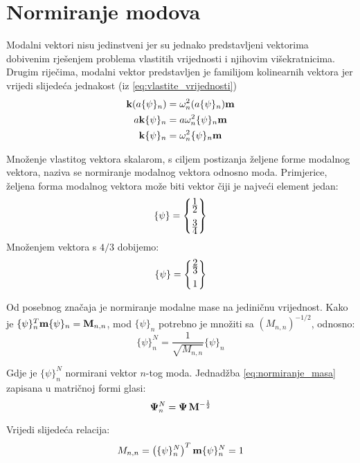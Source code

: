 \section{Normiranje modova}
Modalni vektori nisu jedinstveni jer su jednako predstavljeni vektorima dobivenim
rješenjem problema vlastitih vrijednosti i njihovim višekratnicima. Drugim riječima,
modalni vektor predstavljen je familijom kolinearnih vektora jer vrijedi slijedeća
jednakost (iz \eqref{eq:vlastite_vrijednosti})
\[
    \begin{aligned}
        \mathbf{k}(a\{\psi\}_n)&=\omega_n^2(a\{\psi\}_n)\mathbf{m}\\
        a\mathbf{k}\{\psi\}_n&=a\omega_n^2\{\psi\}{}_n\mathbf{m}\\
        \mathbf{k}\{\psi\}_n&=\omega_n^2\{\psi\}_n\mathbf{m}
    \end{aligned}
\]

Množenje vlastitog vektora skalarom, s ciljem postizanja željene forme modalnog
vektora, naziva se normiranje modalnog vektora odnosno moda. Primjerice, željena forma 
modalnog vektora može biti vektor čiji je najveći element jedan:
\[
    \{\psi\}=
        \begin{Bmatrix}
            \frac{\displaystyle 1}{\displaystyle 2}\\[8pt]
            \frac{\displaystyle 3}{\displaystyle 4}
        \end{Bmatrix}
\]
Množenjem vektora s $4/3$ dobijemo:
\[
    \{\psi\}=
        \begin{Bmatrix}
            \frac{\displaystyle 2}{\displaystyle 3}\\[6pt]
            1
        \end{Bmatrix}
\]

Od posebnog značaja je normiranje modalne mase na jediničnu vrijednost. Kako je
$\{\psi\}_n^T\mathbf{m}\{\psi\}_n=\mathbf{M}_{n,n}$, mod $\{\psi\}_n$
potrebno je množiti sa $(M_{n,n})^{-1/2}$, odnosno:
\begin{equation}\label{eq:normiranje_masa}
    \{\psi\}_n^N=\frac{1}{\sqrt{M_{n,n}}}\{\psi\}_n
\end{equation}

Gdje je $\{\psi\}_n^N$ normirani vektor $n$-tog moda. Jednadžba
\eqref{eq:normiranje_masa} zapisana u matričnoj formi glasi:
\begin{equation}\label{eq:normiranje_masa_matricno}
    \mathbf{\Psi}_n^N=\mathbf{\Psi}\,\mathbf{M}^{-\frac{1}{2}}
\end{equation}

Vrijedi slijedeća relacija:
\begin{equation}\label{eq:relacija_normirani}
        M_{n,n}=\left(\{\psi\}_n^N\right)^T\mathbf{m}\{\psi\}{}_n^N=1
\end{equation}


